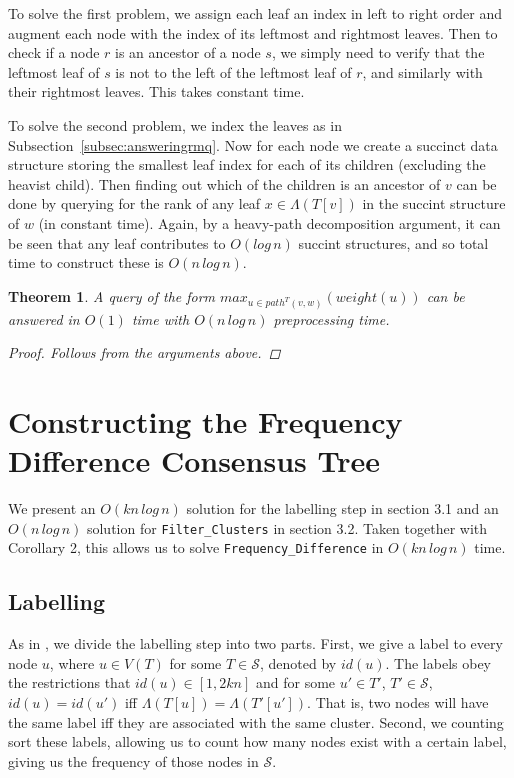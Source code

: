 \documentclass{article}
\newcommand{\leafset}{\Lambda}
\newtheorem{rmqstructure}[incompatibility]{Theorem}
\begin{document}
    To solve the first problem, we assign each leaf an index in left to right order and augment each node with the index of its leftmost and rightmost leaves. Then to check if a node $r$ is an ancestor of a node $s$, we simply need to verify that the leftmost leaf of $s$ is not to the left of the leftmost leaf of $r$, and similarly with their rightmost leaves. This takes constant time.

    To solve the second problem, we index the leaves as in Subsection~\ref{subsec:answeringrmq}. Now for each node we create a succinct data structure storing the smallest leaf index for each of its children (excluding the heavist child). Then finding out which of the children is an ancestor of $v$ can be done by querying for the rank of any leaf $x \in \leafset(T[v])$ in the succint structure of $w$ (in constant time). Again, by a heavy-path decomposition argument, it can be seen that any leaf contributes to $O(log\,n)$ succint structures, and so total time to construct these is $O(n\,log\,n)$.
    \newline

    \begin{rmqstructure}
        \label{theorem:rmqstructure}
        A query of the form $max_{u \in path^{T}(v, w)}(weight(u))$ can be answered in $O(1)$ time with $O(n\,log\,n)$ preprocessing time.

        \begin{proof}
            Follows from the arguments above.
        \end{proof}
    \end{rmqstructure}

    \section{Constructing the Frequency Difference Consensus Tree}
    \label{sec:freqdiffconstruction}

    We present an $O(kn\,log\,n)$ solution for the labelling step in section 3.1 and an $O(n\,log\,n)$ solution for \texttt{Filter\_Clusters} in section 3.2. Taken together with Corollary 2, this allows us to solve \texttt{Frequency\_Difference} in $O(kn\,log\,n)$ time.

    \subsection{Labelling}
    As in \cite{gawrychowski2017faster}, we divide the labelling step into two parts. First, we give a label to every node $u$, where $u \in V(T)$ for some $T \in \mathcal{S}$, denoted by $id(u)$. The labels obey the restrictions that $id(u) \in [1, 2kn]$ and for some $u' \in T'$, $T' \in \mathcal{S}$, $id(u) = id(u')$ iff $\leafset(T[u]) = \leafset(T'[u'])$. That is, two nodes will have the same label iff they are associated with the same cluster. Second, we counting sort these labels, allowing us to count how many nodes exist with a certain label, giving us the frequency of those nodes in $\mathcal{S}$.
\end{document}
